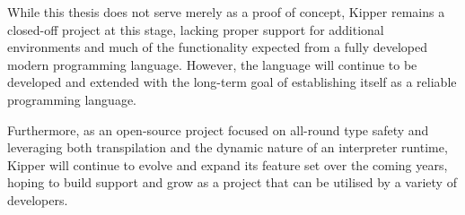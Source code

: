 While this thesis does not serve merely as a proof of concept, Kipper remains a closed-off project at this stage, lacking proper support for additional environments and much of the functionality expected from a fully developed modern programming language. However, the language will continue to be developed and extended with the long-term goal of establishing itself as a reliable programming language.

Furthermore, as an open-source project focused on all-round type safety and leveraging both \gls{transpilation} and the dynamic nature of an interpreter runtime, Kipper will continue to evolve and expand its feature set over the coming years, hoping to build support and grow as a project that can be utilised by a variety of developers.

